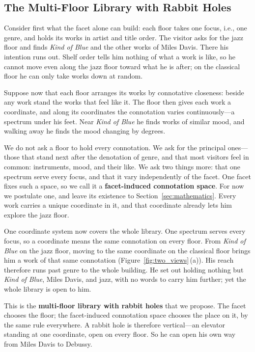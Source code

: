 \subsection{The Multi-Floor Library with Rabbit
    Holes}\label{subsec:multi_floor_library}

Consider first what the facet alone can build: each floor takes one focus,
i.e., one genre, and holds its works in artist and title order. The visitor
asks for the jazz floor and finds \textit{Kind of Blue} and the other works
of Miles Davis. There his intention runs out. Shelf order tells him nothing
of what a work is like, so he cannot move even along the jazz floor toward
what he is after; on the classical floor he can only take works down at
random.

Suppose now that each floor arranges its works by connotative closeness:
beside any work stand the works that feel like it. The floor then gives each
work a coordinate, and along its coordinates the connotation varies
continuously---a spectrum under his feet. Near \textit{Kind of Blue} he finds
works of similar mood, and walking away he finds the mood changing by degrees.

We do not ask a floor to hold every connotation. We ask for the principal
ones---those that stand next after the denotation of genre, and that most
visitors feel in common: instruments, mood, and their like. We ask two things
more: that one spectrum serve every focus, and that it vary independently of the
facet. One facet fixes such a space, so we call it a \textbf{facet-induced
    connotation space}. For now we postulate one, and leave its existence to
Section~\ref{sec:mathematics}. Every work carries a unique coordinate in it, and
that coordinate already lets him explore the jazz floor.

One coordinate system now covers the whole library. One spectrum serves every
focus, so a coordinate means the same connotation on every floor. From
\textit{Kind of Blue} on the jazz floor, moving to the same coordinate on the
classical floor brings him a work of that same connotation
(Figure~\ref{fig:two_views}\,(a)). His reach therefore runs past genre to the
whole building. He set out holding nothing but \textit{Kind of Blue}, Miles
Davis, and jazz, with no words to carry him further; yet the whole library is
open to him.

This is the \textbf{multi-floor library with rabbit holes} that we propose.
The facet chooses the floor; the facet-induced connotation space chooses
the place on it, by the same rule everywhere. A rabbit hole is
therefore vertical---an elevator standing at one coordinate, open on every
floor. So he can open his own way from Miles Davis to Debussy.

